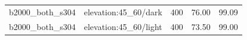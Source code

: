 \begin{longtable}{l>{\raggedright\arraybackslash}p{.42\linewidth}rrr}
b2000\_\allowbreak{}both\_\allowbreak{}s304 & %
elevation:45\_\allowbreak{}60/dark & %
400 & %
76.00 & %
99.09 \\ %

b2000\_\allowbreak{}both\_\allowbreak{}s304 & %
elevation:45\_\allowbreak{}60/light & %
400 & %
73.50 & %
99.00 \\ %


\end{longtable}
